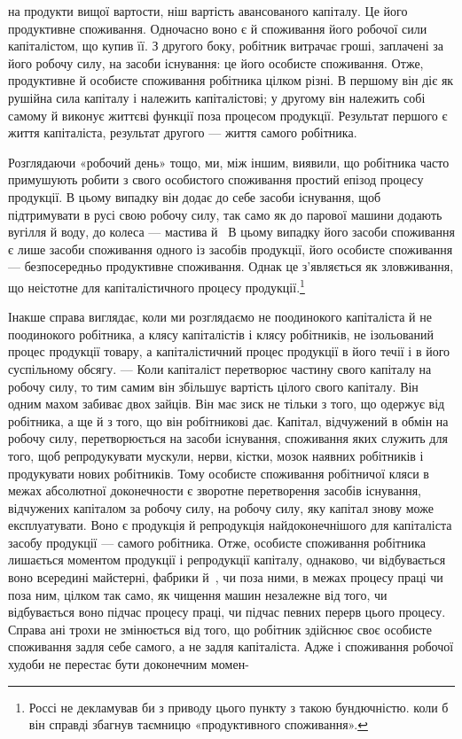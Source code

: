\parcont{}  %
на продукти вищої вартости, ніш вартість авансованого капіталу.
Це його продуктивне споживання. Одночасно воно є й
споживання його робочої сили капіталістом, що купив її. З другого
боку, робітник витрачає гроші, заплачені за його робочу
силу, на засоби існування: це його особисте споживання. Отже,
продуктивне й особисте споживання робітника цілком різні.
В першому він діє як рушійна сила капіталу і належить капіталістові;
у другому він належить собі самому й виконує життєві
функції поза процесом продукції. Результат першого є життя
капіталіста, результат другого — життя самого робітника.

Розглядаючи «робочий день» тощо, ми, між іншим, виявили,
що робітника часто примушують робити з свого особистого споживання
простий епізод процесу продукції. В цьому випадку
він додає до себе засоби існування, щоб підтримувати в русі
свою робочу силу, так само як до парової машини додають вугілля
й воду, до колеса — мастива й~ В цьому випадку його засоби
споживання є лише засоби споживання одного із засобів продукції,
його особисте споживання — безпосередньо продуктивне
споживання. Однак це з’являється як зловживання, що неістотне
для капіталістичного процесу продукції.\footnote{
Россі не декламував би з приводу цього пункту з такою бундючністю.
коли б він справді збагнув таємницю «продуктивного споживання».
}

Інакше справа виглядає, коли ми розглядаємо не поодинокого
капіталіста й не поодинокого робітника, а клясу капіталістів
і клясу робітників, не ізольований процес продукції товару, а
капіталістичний процес продукції в його течії і в його суспільному
обсягу. — Коли капіталіст перетворює частину свого капіталу
на робочу силу, то тим самим він збільшує вартість цілого
свого капіталу. Він одним махом забиває двох зайців. Він має
зиск не тільки з того, що одержує від робітника, а ще й з того,
що він робітникові дає. Капітал, відчужений в обмін на робочу
силу, перетворюється на засоби існування, споживання яких
служить для того, щоб репродукувати мускули, нерви, кістки,
мозок наявних робітників і продукувати нових робітників. Тому
особисте споживання робітничої кляси в межах абсолютної
доконечности є зворотне перетворення засобів існування, відчужених
капіталом за робочу силу, на робочу силу, яку капітал
знову може експлуатувати. Воно є продукція й репродукція
найдоконечнішого для капіталіста засобу продукції — самого
робітника. Отже, особисте споживання робітника лишається
моментом продукції і репродукції капіталу, однаково, чи відбувається
воно всередині майстерні, фабрики й~, чи поза ними,
в межах процесу праці чи поза ним, цілком так само, як чищення
машин незалежне від того, чи відбувається воно підчас процесу
праці, чи підчас певних перерв цього процесу. Справа ані
трохи не змінюється від того, що робітник здійснює своє особисте
споживання задля себе самого, а не задля капіталіста. Адже і
споживання робочої худоби не перестає бути доконечним момен-
\parbreak{}  %
